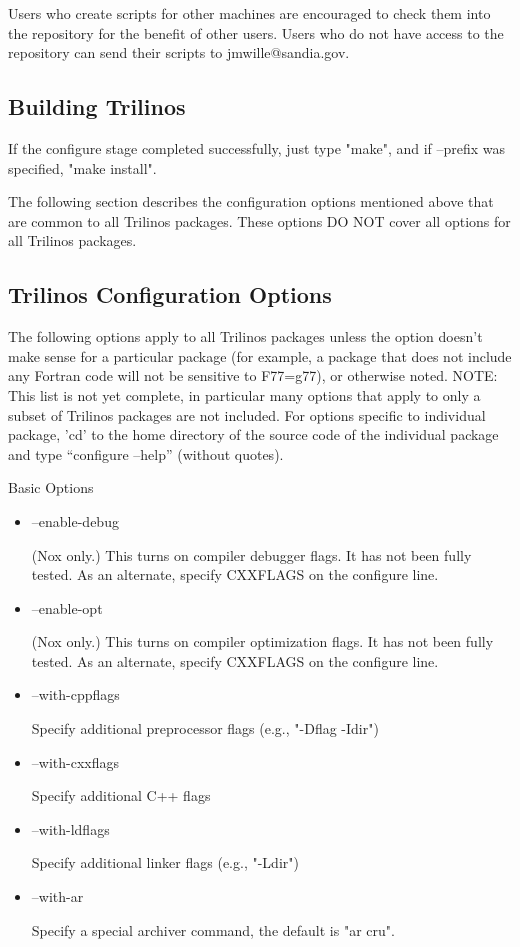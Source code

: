 \documentclass[12pt,relax]{SANDreport}
\begin{document}
Users who create scripts for other machines are encouraged to check them into 
the repository for the benefit of other users.  Users who do not have access to
the repository can send their scripts to jmwille@sandia.gov.

\subsection{Building Trilinos}

If the configure stage completed successfully, just type "make", and if 
--prefix was specified, "make install".

The following section describes the configuration options mentioned above that 
are common to all Trilinos packages.  These options DO NOT cover all options 
for all Trilinos packages.

\subsection{Trilinos Configuration Options}

The following options apply to all Trilinos packages unless 
the option doesn't make sense for a particular package (for example, a 
package that does not include any Fortran code will not be sensitive to 
F77=g77), or otherwise noted.  NOTE: This list is not yet complete, in 
particular many options that apply to only a subset of Trilinos packages 
are not included.  For options specific to individual package, 'cd' to the 
home directory of the source code of the individual package and type 
``configure --help'' (without quotes).

Basic Options

\begin{itemize}
\item --enable-debug 

(Nox only.)  This turns on compiler debugger flags. It has 
not been fully tested. As an alternate, specify CXXFLAGS on the 
                 configure line.

\item --enable-opt

(Nox only.)  This turns on compiler optimization flags. It 
has not been fully tested. As an alternate, specify CXXFLAGS on the 
                 configure line. 

\item --with-cppflags 

Specify additional preprocessor flags (e.g., "-Dflag -Idir") 

\item --with-cxxflags 

Specify additional C++ flags 

\item --with-ldflags 

Specify additional linker flags (e.g., "-Ldir") 

\item --with-ar 

Specify a special archiver command, the default is "ar cru". 
\end{itemize}
\end{document}
